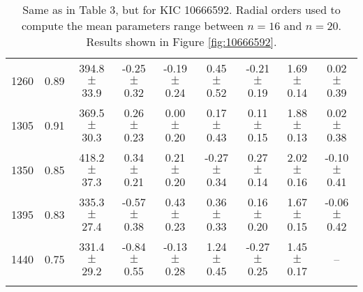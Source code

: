\documentclass[twocolumn]{aastex61}%
\begin{document}
\begin{table*}[ht]
\begin{tabular}{ccc|ccccc|c}
1260 & 0.89 & 394.8 $\pm$ 33.9 & -0.25 $\pm$ 0.32 & -0.19 $\pm$ 0.24 & 0.45 $\pm$ 0.52 & -0.21 $\pm$ 0.19 & 1.69 $\pm$ 0.14 & 0.02 $\pm$ 0.39\\
1305 & 0.91 & 369.5 $\pm$ 30.3 & 0.26 $\pm$ 0.23 & 0.00 $\pm$ 0.20 & 0.17 $\pm$ 0.43 & 0.11 $\pm$ 0.15 & 1.88 $\pm$ 0.13 & 0.02 $\pm$ 0.38\\
1350 & 0.85 & 418.2 $\pm$ 37.3 & 0.34 $\pm$ 0.21 & 0.21 $\pm$ 0.20 & -0.27 $\pm$ 0.34 & 0.27 $\pm$ 0.14 & 2.02 $\pm$ 0.16 & -0.10 $\pm$ 0.41\\
1395 & 0.83 & 335.3 $\pm$ 27.4 & -0.57 $\pm$ 0.38 & 0.43 $\pm$ 0.23 & 0.36 $\pm$ 0.33 & 0.16 $\pm$ 0.20 & 1.67 $\pm$ 0.15 & -0.06 $\pm$ 0.42\\
1440 & 0.75 & 331.4 $\pm$ 29.2 & -0.84 $\pm$ 0.55 & -0.13 $\pm$ 0.28 & 1.24 $\pm$ 0.45 & -0.27 $\pm$ 0.25 & 1.45 $\pm$ 0.17 & --\\\vspace{-0.3cm}
\end{tabular}
\caption{Same as in Table 3, but for KIC 10666592. Radial orders used to compute the mean parameters range between $n=16$ and $n=20$. Results shown in Figure \ref{fig:10666592}.}\label{tab:10666592}
\end{table*}
\end{document}
